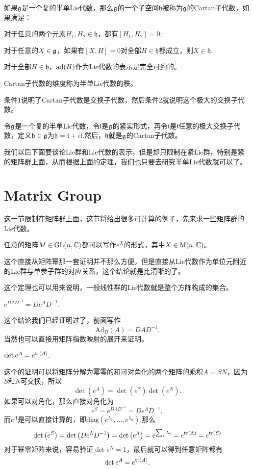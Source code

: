 \para 如果${\mathfrak{g}}$是一个复的半单Lie代数，那么${\mathfrak{g}}$的一个子空间$\mathfrak{h}$被称为${\mathfrak{g}}$的Cartan子代数，如果满足：

 对于任意的两个元素$H_1,H_2\in\mathfrak{h}$，都有$[H_1,H_2]=0$;

 对于任意的$X\in {\mathfrak{g}}$，如果有$[X,H]=0$对全部$H\in\mathfrak{h}$都成立，则$X\in \mathfrak{h}$.

 对于全部$H\in \mathfrak{h}$，${\mathrm{ad}}(H)$作为Lie代数的表示是完全可约的。

Cartan子代数的维度称为半单Lie代数的秩。

条件1说明了Cartan子代数是交换子代数，然后条件2就说明这个极大的交换子代数。

\pro
令${\mathfrak{g}}$是一个复的半单Lie代数，令$\mathfrak{l}$是${\mathfrak{g}}$的紧实形式，再令$\mathfrak{t}$是$\mathfrak{l}$任意的极大交换子代数，定义$\mathfrak{h}\in{\mathfrak{g}}$为$\mathfrak{h}=\mathfrak{t}+i\mathfrak{t}$.然后，$\mathfrak{h}$就是${\mathfrak{g}}$的Cartan子代数。


我们以后下面要谈论Lie群和Lie代数的表示，但是却只限制在紧Lie群，特别是紧的矩阵群上面，从而根据上面的定理，我们也只要去研究半单Lie代数就可以了。

\section{Matrix Group}
这一节限制在矩阵群上面，这节将给出很多可计算的例子，先来求一些矩阵群的Lie代数。
\begin{theo}
任意的矩阵$M\in\mathrm{GL}(n,\mathbb{C})$都可以写作$e^X$的形式，其中$X\in\mathrm{M}(n,\mathbb{C})$。
\end{theo}
这个直接从矩阵幂那一套证明并不那么方便，但是直接从Lie代数作为单位元附近的Lie群与单参子群的对应关系，这个结论就是比清晰的了。

这个定理也可以用来说明，一般线性群的Lie代数就是整个方阵构成的集合。

\pro
	$e^{DAD^{-1}}=De^{A}D^{-1}$.

这个结论我们已经证明过了，前面写作
\[
	\mathrm{Ad}_D(A)=DAD^{-1}.
\]
当然也可以直接用矩阵指数映射的展开来证明。

\pro
$\det e^A=e^{\operatorname{tr}(A)}$.

这个的证明可以将矩阵分解为幂零的和可对角化的两个矩阵的乘积$A=SN$，因为$S$和$N$可交换，所以
\[
	\det \left(e^A\right)=\det\left(e^S\right)\det\left(e^N\right).
\]
如果可以对角化，那么直接对角化为
\[
	e^{S}=e^{D\Lambda D^{-1}}=De^{\Lambda} D^{-1},
\]
而$e^{\Lambda}$是可以直接计算的，即$\mathrm{diag}\left(e^{\lambda_1},\dots,e^{\lambda_n}\right)$.那么
\[
	\det \left(e^{S}\right)=\det \left(De^{\Lambda} D^{-1}\right)=\det \left(e^{\Lambda}\right)=e^{\sum_i \lambda_i}=e^{\operatorname{tr}(\Lambda)}=e^{\operatorname{tr}(S)}
\]
对于幂零矩阵来说，容易验证$\det e^N=1$，最后就可以得到任意矩阵都有
\[
	\det e^A=e^{\operatorname{tr}(A)}.
\]

